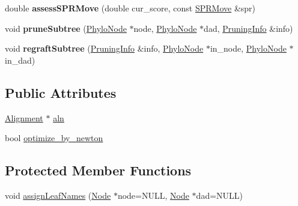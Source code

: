 \begin{DoxyCompactItemize}
\item 
\hypertarget{classPhyloTree_a73cd13227a66c17b96465fdc908e069f}{
double {\bfseries assessSPRMove} (double cur\_\-score, const \hyperlink{structSPRMove}{SPRMove} \&spr)}
\label{classPhyloTree_a73cd13227a66c17b96465fdc908e069f}

\item 
\hypertarget{classPhyloTree_a2a4ae0ce3b7ac61a7a870280afb85206}{
void {\bfseries pruneSubtree} (\hyperlink{classPhyloNode}{PhyloNode} $\ast$node, \hyperlink{classPhyloNode}{PhyloNode} $\ast$dad, \hyperlink{structPruningInfo}{PruningInfo} \&info)}
\label{classPhyloTree_a2a4ae0ce3b7ac61a7a870280afb85206}

\item 
\hypertarget{classPhyloTree_aa87d04899ec1ece927f02dbfa989afbf}{
void {\bfseries regraftSubtree} (\hyperlink{structPruningInfo}{PruningInfo} \&info, \hyperlink{classPhyloNode}{PhyloNode} $\ast$in\_\-node, \hyperlink{classPhyloNode}{PhyloNode} $\ast$in\_\-dad)}
\label{classPhyloTree_aa87d04899ec1ece927f02dbfa989afbf}

\end{DoxyCompactItemize}
\subsection*{Public Attributes}
\begin{DoxyCompactItemize}
\item 
\hyperlink{classAlignment}{Alignment} $\ast$ \hyperlink{classPhyloTree_a155032795a2a06262959ecba6fa1761b}{aln}
\item 
bool \hyperlink{classPhyloTree_ab17482e0cf6b9ea6def40d2c49bf0f3a}{optimize\_\-by\_\-newton}
\end{DoxyCompactItemize}
\subsection*{Protected Member Functions}
\begin{DoxyCompactItemize}
\item 
void \hyperlink{classPhyloTree_a5a35504080c18e60b3a3019c8d457253}{assignLeafNames} (\hyperlink{classNode}{Node} $\ast$node=NULL, \hyperlink{classNode}{Node} $\ast$dad=NULL)
\end{DoxyCompactItemize}

